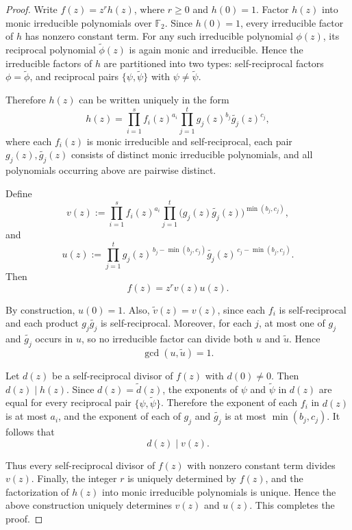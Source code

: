 \documentclass[hidelinks,onefignum,onetabnum]{siamart251216}
\theoremstyle{definition}
\theoremstyle{remark}
\begin{document}
\begin{proof}
	Write $f(z)=z^r h(z)$, where $r\ge 0$ and $h(0)=1$. Factor $h(z)$ into monic irreducible polynomials over $\mathbb F_2$. Since $h(0)=1$, every
	irreducible factor of $h$ has nonzero constant term. For any such irreducible polynomial
	$\phi(z)$, its reciprocal polynomial $\widetilde{\phi}(z)$ is again monic and irreducible.
	Hence the irreducible factors of $h$ are partitioned into two types: self-reciprocal factors
	$\phi=\widetilde{\phi}$, and reciprocal pairs $\{\psi,\widetilde{\psi}\}$ with
	$\psi\ne \widetilde{\psi}$.
	
	Therefore $h(z)$ can be written uniquely in the form
	\[
	h(z)=\prod_{i=1}^s f_i(z)^{a_i}\prod_{j=1}^t g_j(z)^{b_j}\widetilde{g_j}(z)^{c_j},
	\]
	where each $f_i(z)$ is monic irreducible and self-reciprocal, each pair
	$g_j(z),\widetilde{g_j}(z)$ consists of distinct monic irreducible polynomials, and all
	polynomials occurring above are pairwise distinct.
	
	Define
	\[
	v(z):=\prod_{i=1}^s f_i(z)^{a_i}
	\prod_{j=1}^t \bigl(g_j(z)\widetilde{g_j}(z)\bigr)^{\min(b_j,c_j)},
	\]
	and
	\[
	u(z):=\prod_{j=1}^t g_j(z)^{\,b_j-\min(b_j,c_j)}
	\widetilde{g_j}(z)^{\,c_j-\min(b_j,c_j)}.
	\]
	Then
	\[
	f(z)=z^r v(z)u(z).
	\]
	
	By construction, $u(0)=1$. Also, $\widetilde{v}(z)=v(z)$, since each $f_i$ is self-reciprocal and
	each product $g_j\widetilde{g_j}$ is self-reciprocal. Moreover, for each $j$, at most one of
	$g_j$ and $\widetilde{g_j}$ occurs in $u$, so no irreducible factor can divide both $u$ and
	$\widetilde{u}$. Hence
	\[
	\gcd(u,\widetilde{u})=1.
	\]
	
	Let $d(z)$ be a self-reciprocal divisor of $f(z)$ with $d(0)\ne 0$. Then $d(z)\mid h(z)$.
	Since $d(z)=\widetilde{d}(z)$, the exponents of $\psi$ and $\widetilde{\psi}$ in $d(z)$ are equal
	for every reciprocal pair $\{\psi,\widetilde{\psi}\}$. Therefore the exponent of each $f_i$ in
	$d(z)$ is at most $a_i$, and the exponent of each of $g_j$ and $\widetilde{g_j}$ is at most
	$\min(b_j,c_j)$. It follows that
	\[
	d(z)\mid v(z).
	\]
	
	Thus every self-reciprocal divisor of $f(z)$ with nonzero constant term divides $v(z)$. Finally, the integer $r$ is uniquely determined by $f(z)$, and the factorization of $h(z)$ into monic irreducible polynomials is unique. Hence the above construction uniquely determines $v(z)$ and $u(z)$.
	This completes the proof.
\end{proof}
\end{document}
